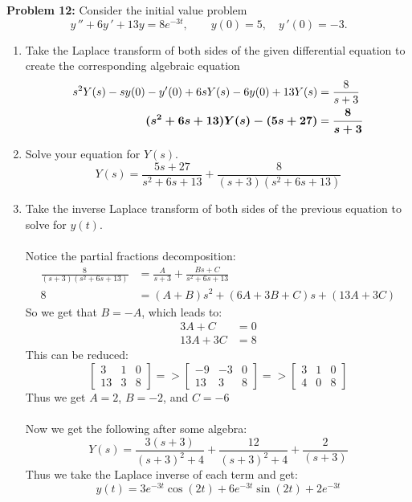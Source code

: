 \documentclass[12pt]{article}
\begin{document}
\newpage 

\noindent \textbf{Problem 12: } Consider the initial value problem
	$$
	y\,'' + 6 y\,' + 13 y = 8 e^{-3 t}, \quad \quad y(0) = 5, \quad y\,'(0) = -3.
	$$
	\begin{enumerate}[label = (\alph*)]
		\item Take the Laplace transform of both sides of the given differential equation to create the corresponding algebraic equation
			\begin{align*}
				s^2Y(s) -sy(0) - y'(0) + 6sY(s) - 6y(0) + 13Y(s) &= \frac{8}{s+3} \\
				\text{\boldmath $(s^2 + 6s + 13)Y(s) - (5s + 27)$} &= \text{\boldmath $\frac{8}{s+3}$}
			\end{align*}
		\item Solve your equation for $Y(s)$.
			\boldmath
			$$
			Y(s) =\frac{5s + 27}{s^2 + 6s + 13} + \frac{8}{(s+3)(s^2 + 6s + 13)}
			$$
			\unboldmath
		\item Take the inverse Laplace transform of both sides of the previous equation to solve for $y(t)$.
		\\ \\
		Notice the partial fractions decomposition:
			\begin{align*}
				\frac{8}{(s+3)(s^2 + 6s + 13)} &= \frac{A}{s+3} + \frac{Bs + C}{s^2 + 6s + 13} \\
				8 &= (A+B)s^2 + (6A + 3B + C)s + (13A + 3C) 
			\end{align*}
		So we get that $B = -A$, which leads to:
			\begin{align*}
				3A + C &= 0 \\
				13A + 3C &= 8 
			\end{align*}
		This can be reduced:
			$$
			\begin{bmatrix}
				3 & 1 & 0 \\
				13 & 3 & 8
			\end{bmatrix}
			=> 
			\begin{bmatrix}
				-9 & -3 & 0 \\
				13 & 3 & 8
			\end{bmatrix}
			=>
			\begin{bmatrix}
				3 & 1 & 0 \\
				4 & 0 & 8
			\end{bmatrix}
			$$
		Thus we get $A = 2$, $B = -2$, and $C = -6$ 
		\\ \\
		Now we get the following after some algebra:
			$$
			Y(s) = \frac{3(s+3)}{(s+3)^2 + 4} + \frac{12}{(s+3)^2 + 4} + \frac{2}{(s+3)}
			$$
		Thus we take the Laplace inverse of each term and get:
			\boldmath
			$$
			y(t) = 3e^{-3t}\cos(2t) + 6e^{-3t}\sin(2t) + 2e^{-3t} 
			$$
			\unboldmath
	\end{enumerate}
\end{document}
